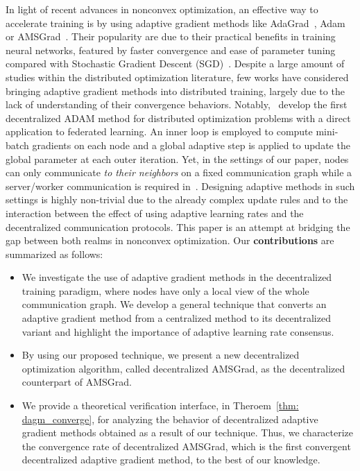 \documentclass[11pt]{article}
\begin{document}
In light of recent advances in nonconvex optimization, an effective way to accelerate training is by using adaptive gradient methods like AdaGrad~\citep{duchi2011adaptive}, Adam~\citep{kingma2014adam} or AMSGrad~\citep{reddi2019convergence}. 
Their popularity are due to their practical benefits in training neural networks, featured by faster convergence and ease of parameter tuning compared with Stochastic Gradient Descent (SGD)~\citep{robbins1951stochastic}.
Despite a large amount of studies within the distributed optimization literature, few works have considered bringing adaptive gradient methods into distributed training, largely due to the lack of understanding of their convergence behaviors. 
Notably,~\citet{reddi2020adaptive} develop the first decentralized ADAM method for distributed optimization problems with a direct application to federated learning.
An inner loop is employed to compute mini-batch gradients on each node and a global adaptive step is applied to update the global parameter at each outer iteration.
Yet, in the settings of our paper, nodes can only communicate \emph{to their neighbors} on a fixed communication graph while a server/worker communication is required in~\cite{reddi2020adaptive}.
Designing adaptive methods in such settings is highly non-trivial due to the already complex update rules and to the interaction between the effect of using adaptive learning rates and the decentralized communication protocols.
This paper is an attempt at bridging the gap between both realms in nonconvex optimization. 
Our \textbf{contributions} are summarized as follows:
\begin{itemize}
\item We investigate the use of  adaptive gradient methods in the decentralized training paradigm, where nodes have only a local view of the whole communication graph. We develop a general technique that converts an adaptive gradient method from a centralized method to its decentralized variant and highlight the importance of adaptive learning rate consensus. 
\item By using our proposed technique, we present a new decentralized optimization algorithm, called decentralized AMSGrad, as the decentralized counterpart of AMSGrad.
\item We provide a theoretical verification interface, in Theroem~\ref{thm: dagm_converge}, for analyzing the behavior of decentralized adaptive gradient methods obtained as a result of our technique.
Thus, we characterize the convergence rate of decentralized AMSGrad, which is the first convergent decentralized adaptive gradient method, to the best of our knowledge.
\end{itemize}
\end{document}
